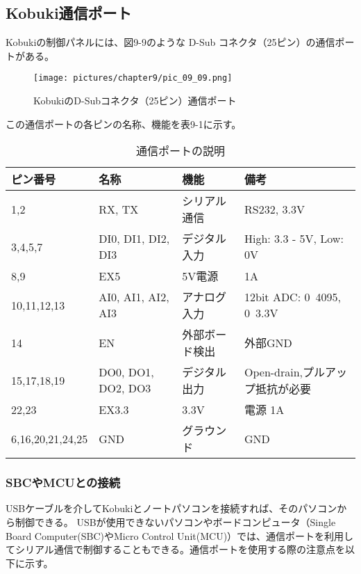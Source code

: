\subsection{Kobuki通信ポート}

Kobukiの制御パネルには、図9-9のような D-Sub コネクタ（25ピン）の通信ポートがある。

\begin{figure}[htp]
  \centering
  \texttt{[image: pictures/chapter9/pic\_09\_09.png]}
  \caption{KobukiのD-Subコネクタ（25ピン）通信ポート}
\end{figure}

この通信ポートの各ピンの名称、機能を表9-1に示す。

\begin{table}[htp]
\centering
\small
\begin{tabular}{p{3cm} p{3cm} p{3cm} p{3cm}}
\toprule
\textbf{ピン番号} & \textbf{名称} & \textbf{機能} & \textbf{備考}\\
\midrule
1,2 & RX, TX  & シリアル通信  & RS232, 3.3V \\
3,4,5,7 & DI0, DI1, DI2, DI3  & デジタル入力  & High: 3.3 - 5V, Low: 0V \\
8,9 & EX5 & 5V電源  & 1A \\
10,11,12,13 & AI0, AI1, AI2, AI3  & アナログ入力  & 12bit ADC: 0~4095, 0~3.3V \\
14  & EN  & 外部ボード検出 & 外部GND \\
15,17,18,19 & DO0, DO1, DO2, DO3  & デジタル出力  & Open-drain,プルアップ抵抗が必要 \\
22,23 & EX3.3 & 3.3V & 電源 1A \\
6,16,20,21,24,25  & GND & グラウンド & GND \\
\bottomrule
\end{tabular}
\caption{通信ポートの説明}
\end{table}

\subsubsection{SBCやMCUとの接続}

USBケーブルを介してKobukiとノートパソコンを接続すれば、そのパソコンから制御できる。  USBが使用できないパソコンやボードコンピュータ（Single Board Computer(SBC)やMicro Control Unit(MCU)）では、通信ポートを利用してシリアル通信で制御することもできる。通信ポートを使用する際の注意点を以下に示す。

